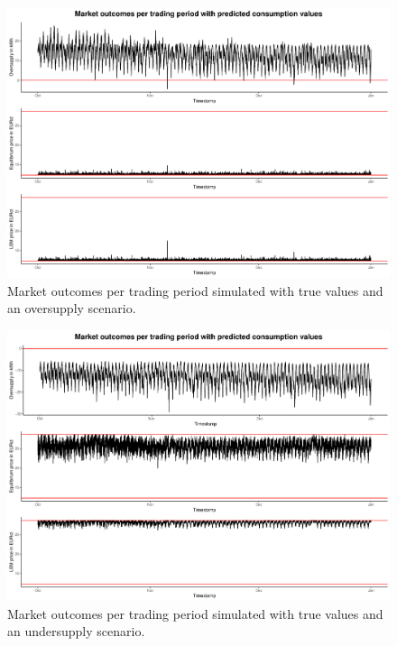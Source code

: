\begin{figure}[htbp]
    \centering
    \includegraphics[width=\textwidth]{thesis/graphs/marketsimulation/marketoutcome_pred_oversupply.pdf}
    \caption[Market outcomes simulated with oversupply and predicted values]{Market outcomes per trading period simulated with true values and an oversupply scenario. \quantnet\href{}{}}
\end{figure}


\begin{figure}[htbp]
    \centering
    \includegraphics[width=\textwidth]{thesis/graphs/marketsimulation/marketoutcome_pred_undersupply.pdf}
    \caption[Market outcomes simulated with undersupply and predicted values]{Market outcomes per trading period simulated with true values and an undersupply scenario. \quantnet\href{}{}}
\end{figure}

